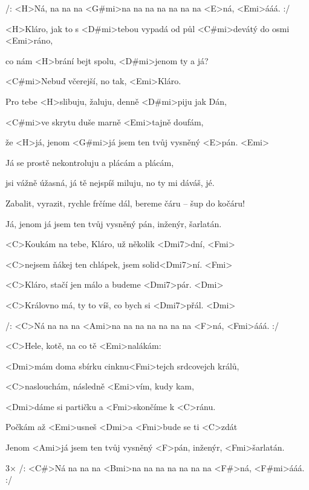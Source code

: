 

/: <H>Ná, na na na <G#mi>na na na na na na na <E>ná, <Emi>ááá. :/

\zs
<H>Kláro, jak to s <D#mi>tebou vypadá od půl <C#mi>devátý do osmi <Emi>ráno,

co nám <H>brání bejt spolu, <D#mi>jenom ty a já?

<C#mi>Nebuď včerejší, no tak, <Emi>Kláro.

Pro tebe <H>slibuju, žaluju, denně <D#mi>piju jak Dán,

<C#mi>ve skrytu duše marně <Emi>tajně doufám,

že <H>já, jenom <G#mi>já jsem ten tvůj vysněný <E>pán. <Emi>
\ks

\zs
Já se prostě nekontroluju a plácám a plácám,

jsi vážně úžasná, já tě nejspíš miluju,
no ty mi dáváš, jé.

Zabalit, vyrazit, rychle frčíme dál,
bereme čáru -- šup do kočáru!

Já, jenom já jsem ten tvůj vysněný pán,
inženýr, šarlatán.
\ks

\zr
<C>Koukám na tebe, Kláro, už několik <Dmi7>dní, <Fmi>

<C>nejsem ňákej ten chlápek, jsem solid<Dmi7>ní. <Fmi>

<C>Kláro, stačí jen málo a budeme <Dmi7>pár. <Dmi>

<C>Královno má, ty to víš, co bych si <Dmi7>přál. <Dmi>
\kr


/: <C>Ná na na na <Ami>na na na na na na na <F>ná, <Fmi>ááá. :/


\zs
<C>Hele, kotě, na co tě <Emi>nalákám:

<Dmi>mám doma sbírku cinknu<Fmi>tejch srdcovejch králů,

<C>naslouchám, následně <Emi>vím, kudy kam,

<Dmi>dáme si partičku a <Fmi>skončíme k <C>ránu.

Počkám až <Emi>usneš <Dmi>a <Fmi>bude se ti <C>zdát

Jenom <Ami>já jsem ten tvůj vysněný <F>pán,
inženýr, <Fmi>šarlatán.
\ks

\zr \kr

3× /: <C#>Ná na na na <Bmi>na na na na na na na <F#>ná, 
<F#mi>ááá. :/

\kp
